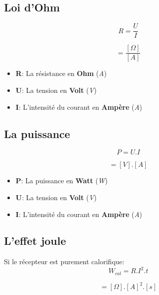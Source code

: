  \subsection{Loi d'Ohm}

 \begin{equation}
	 R=\frac{U}{I}
 \end{equation}

 \begin{equation}
	 [\Omega]=\frac{[\Omega]}{[A]}
 \end{equation}

 \begin{itemize}
	 \item \textbf{R}: La résistance en \textbf{Ohm} (\textit{A})
	 \item \textbf{U}: La tension en \textbf{Volt} (\textit{V})
	 \item \textbf{I}: L'intensité du courant en \textbf{Ampère} (\textit{A})
 \end{itemize}

 \subsection{La puissance}

 \begin{equation}
	 P=U.I
 \end{equation}

 \begin{equation}
	 [W]=[V].[A]
 \end{equation}

 \begin{itemize}
	 \item \textbf{P}: La puissance en \textbf{Watt} (\textit{W})
	 \item \textbf{U}: La tension en \textbf{Volt} (\textit{V})
	 \item \textbf{I}: L'intensité du courant en \textbf{Ampère} (\textit{A})
 \end{itemize}

 \subsection{L'effet joule}

 Si le récepteur est purement calorifique:
 \begin{equation}
	 W_{cal} = R.I^2.t
 \end{equation}

 \begin{equation}
	 [J]=[\Omega].{[A]}^2.[s]
 \end{equation}

